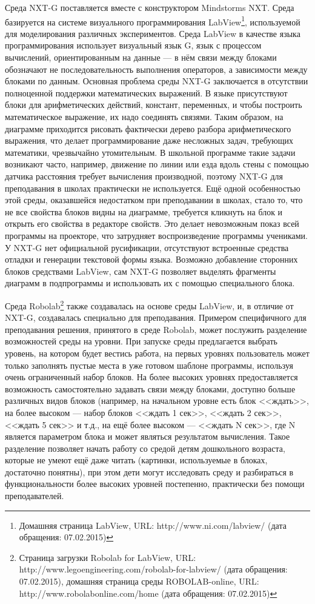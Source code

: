 Среда NXT-G поставляется вместе с конструктором Mindstorms NXT. Среда базируется на системе визуального программирования 
LabView\footnote{Домашняя страница LabView, URL: http://www.ni.com/labview/ (дата обращения: 07.02.2015)}, 
используемой для моделирования различных экспериментов. Среда LabView в качестве 
языка программирования использует визуальный язык G, язык с процессом вычислений, 
ориентированным на данные --- в нём связи между блоками обозначают не последовательность 
выполнения операторов, а зависимости между блоками по данным. Основная проблема среды NXT-G 
заключается в отсутствии полноценной поддержки математических выражений. В языке присутствуют 
блоки для арифметических действий, констант, переменных, и чтобы построить математическое
выражение, их надо соединять связями. Таким образом, на диаграмме приходится рисовать 
фактически дерево разбора арифметического выражения, что делает программирование даже 
несложных задач, требующих математики, чрезвычайно утомительным. В школьной программе 
такие задачи возникают часто, например, движение по линии или езда вдоль стены с помощью 
датчика расстояния требует вычисления производной, поэтому NXT-G для преподавания в 
школах практически не используется. Ещё одной особенностью этой среды, оказавшейся 
недостатком при преподавании в школах, стало то, что не все свойства блоков видны 
на диаграмме, требуется кликнуть на блок и открыть его свойства в редакторе свойств. 
Это делает невозможным показ всей программы на проекторе, что затрудняет воспроизведение 
программы учениками. У NXT-G нет официальной русификации, отсутствуют встроенные 
средства отладки и генерации текстовой формы языка. Возможно добавление сторонних 
блоков средствами LabView, сам NXT-G позволяет выделять фрагменты диаграмм в подпрограммы 
и использовать их с помощью специального блока.

Среда Robolab\footnote{Страница загрузки Robolab for LabView, URL: http://www.legoengineering.com/robolab-for-labview/ (дата обращения: 07.02.2015), 
домашняя страница среды ROBOLAB-online, URL: http://www.robolabonline.com/home (дата обращения: 07.02.2015)}
также создавалась на основе среды LabView, и, в отличие от NXT-G, создавалась 
специально для преподавания. Примером специфичного для преподавания решения, принятого 
в среде Robolab, может послужить разделение возможностей среды на уровни. При запуске 
среды предлагается выбрать уровень, на котором будет вестись работа, на первых уровнях 
пользователь может только заполнять пустые места в уже готовом шаблоне программы, 
используя очень ограниченный набор блоков. На более высоких уровнях предоставляется 
возможность самостоятельно задавать связи между блоками, доступно больше различных 
видов блоков (например, на начальном уровне есть блок <<ждать>>, на более высоком --- 
набор блоков <<ждать 1 сек>>, <<ждать 2 сек>>, <<ждать 5 сек>> и т.д., на ещё более 
высоком --- <<ждать N сек>>, где N является параметром блока и может являться результатом 
вычисления. Такое разделение позволяет начать работу со средой детям дошкольного возраста, 
которые не умеют ещё даже читать (картинки, используемые в блоках, достаточно понятны), 
при этом дети могут исследовать среду и разбираться в функциональности более высоких 
уровней постепенно, практически без помощи преподавателей.


